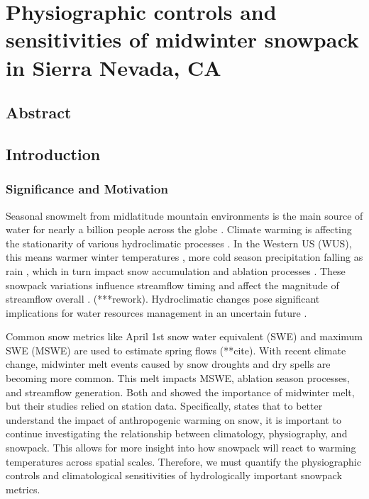 \hypertarget{ch2}{%
\chapter{Physiographic controls and sensitivities of midwinter snowpack in Sierra Nevada, CA}\label{ch2}}

\hypertarget{ch2-abstract}{\section{Abstract}\label{ch2-abstract}}

\hypertarget{ch2-intro}{\section{Introduction}\label{ch2-intro}}
\subsection{Significance and Motivation}
Seasonal snowmelt from midlatitude mountain environments is the main source of water for nearly a billion people across the globe \citep{sturmWaterLifeSnow2017}.
Climate warming is affecting the stationarity of various hydroclimatic processes \citep{millyStationarityDeadWhither2008}. In the Western US (WUS), this means warmer winter temperatures \cite{gergelEffectsClimateChange2017}, more cold season precipitation falling as rain \citep{knowlesTrendsSnowfallRainfall2006}, which in turn impact snow accumulation and ablation processes \citep{kapnickCausesRecentChanges2012}. These snowpack variations influence streamflow timing \citep{stewartChangesSnowmeltRunoff2004} and affect the magnitude of streamflow overall \citep{barnhartSnowmeltRateDictates2016}. (***rework). Hydroclimatic changes pose significant implications for water resources management in an uncertain future \citep{livnehDroughtLessPredictable2020}.

Common snow metrics like April 1st snow water equivalent (SWE) and maximum SWE (MSWE) are used to estimate spring flows (**cite). With recent climate change, midwinter melt events caused by snow droughts \citep{harpoldDefiningSnowDrought2017} and dry spells \citep{hatchettMidwinterDrySpells2023} are becoming more common. This melt impacts MSWE, ablation season processes, and streamflow generation. Both \cite{harpoldHumidityDeterminesSnowpack2018} and \cite{musselmanWinterMeltTrends2021} showed the importance of midwinter melt, but their studies relied on station data. Specifically, \cite{musselmanWinterMeltTrends2021} states that to better understand the impact of anthropogenic warming on snow, it is important to continue investigating the relationship between climatology, physiography, and snowpack. This allows for more insight into how snowpack will react to warming temperatures across spatial scales. Therefore, we must quantify the physiographic controls and climatological sensitivities of hydrologically important snowpack metrics.

